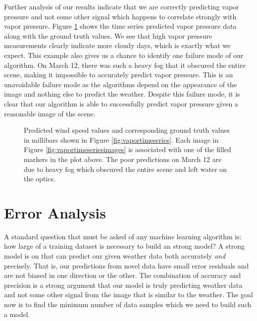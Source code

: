 Further analysis of our results indicate that we are correctly predicting vapor pressure and not some other signal which happens to correlate strongly with vapor pressure. Figure \ref{fig:vaporpred} shows the time series predicted vapor pressure data along with the ground truth values. We see that high vapor pressure measurements clearly indicate more cloudy days, which is exactly what we expect. This example also gives us a chance to identify one failure mode of our algorithm. On March 12, there was such a heavy fog that it obscured the entire scene, making it impossible to accurately predict vapor pressure. This is an unavoidable failure mode as the algorithms depend on the appearance of the image and nothing else to predict the weather. Despite this failure mode, it is clear that our algorithm is able to successfully predict vapor pressure given a reasonable image of the scene.
\begin{figure}
	\centering
	\caption{Predicted wind speed values and corresponding ground truth values in millibars shown in Figure \ref{fig:vaportimeseries}. Each image in Figure \ref{fig:vaportimeseriesimages} is associated with one of the filled markers in the plot above. The poor predictions on March 12 are due to heavy fog which obscured the entire scene and left water on the optics.}
	\label{fig:vaporpred}
\end{figure}


\section{Error Analysis}
A standard question that must be asked of any machine learning algorithm is: how large of a training dataset is necessary to build an strong model? A strong model is on that can predict our given weather data both accurately \textit{and} precisely. That is, our predictions from novel data have small error residuals and are not biased in one direction or the other. The combination of accuracy and precision is a strong argument that our model is truly predicting weather data and not some other signal from the image that is similar to the weather. The goal now is to find the minimum number of data samples which we need to build such a model. 

